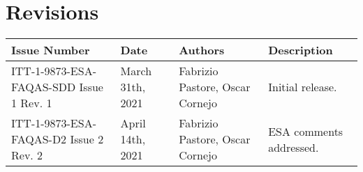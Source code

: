 
\section*{Revisions}
\label{sec:revisions}


\setlength\LTleft{0pt}
\setlength\LTright{0pt}
\scriptsize 
\begin{longtable}{|p{3.5cm}|p{2cm}|p{3cm}|p{6cm}|@{}}
\label{table:codeoperators} \\
\hline
\textbf{Issue Number}&\textbf{Date}&\textbf{Authors}&\textbf{Description}\\
\hline
ITT-1-9873-ESA-FAQAS-SDD
Issue 1 Rev. 1&
March 31th, 2021&
Fabrizio Pastore, Oscar Cornejo&
\begin{minipage}{8cm}
Initial release.
\end{minipage}
\\
\hline
ITT-1-9873-ESA-FAQAS-D2
Issue 2 Rev. 2&
April 14th, 2021&
Fabrizio Pastore, Oscar Cornejo&
\begin{minipage}{8cm}
ESA comments addressed.
\end{minipage}
\\
\hline
\hline



                                                    
\end{longtable}
\normalsize

\clearpage